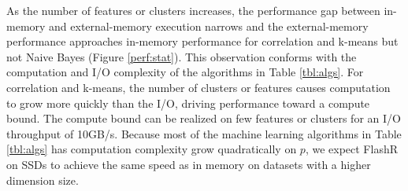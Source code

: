 As the number of features or clusters increases, the performance gap between
in-memory and external-memory execution narrows and the external-memory
performance approaches in-memory performance for correlation and k-means
but not Naive Bayes (Figure \ref{perf:stat}). This observation conforms with
the computation and I/O complexity of the algorithms in Table \ref{tbl:algs}.
For correlation and k-means, the number of clusters or features causes computation
to grow more quickly than the I/O, driving performance toward a compute bound.
The compute bound can be realized on few features or clusters for an I/O throughput of 10GB/s.
Because most of the machine learning algorithms in Table \ref{tbl:algs} has
computation complexity grow quadratically on $p$, we expect FlashR on SSDs to
achieve the same speed as in memory on datasets with a higher dimension size.



